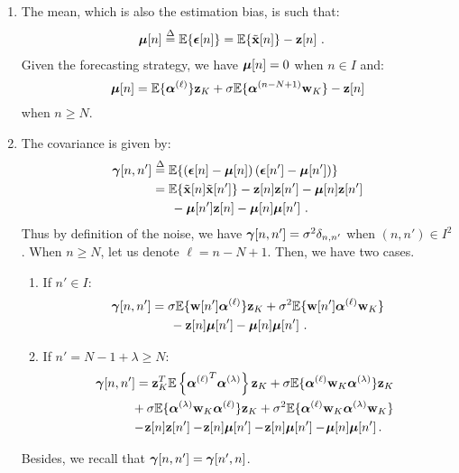 \begin{enumerate}
\item 
The mean, which is also the estimation bias, is such that: 
\begin{align*}
\boldsymbol{\mu}[n]&\overset{\Delta}{=}{\mathbb E}\{\boldsymbol{\epsilon}[n]\} 
={\mathbb E}\{\tilde{{\mathbf x}}[n]\} - {\mathbf z}[n]\ .
\end{align*}
Given the forecasting strategy, we have $\boldsymbol{\mu}[n]=0$ when $n\in I$ and: 
\begin{equation}
\bmu[n]= \EE\{\balpha^{(\ell)}\}\bz_{K} + \sigma\EE\{\balpha^{(n-N+1)}\bw_{K}\} - \bz[n]
\label{eq:bias0}
\end{equation}
when $n\geq N$.
\item 
The covariance is given by:
\begin{align*}
\boldsymbol{\gamma}[n,n'] &\overset{\Delta}{=} {\mathbb E}\{\left(\boldsymbol{\epsilon}[n]-\boldsymbol{\mu}[n]\right)\left(\boldsymbol{\epsilon}[n']-\boldsymbol{\mu}[n']\right)\}\\
&= {\mathbb E}\{\tilde{{\mathbf x}}[n]\tilde{{\mathbf x}}[n']\}-{\mathbf z}[n]{\mathbf z}[n'] -\boldsymbol{\mu}[n]{\mathbf z}[n'] \\
&\hspace{15pt} - \boldsymbol{\mu}[n']{\mathbf z}[n] -\boldsymbol{\mu}[n]\boldsymbol{\mu}[n']\ .
\end{align*}
Thus by definition of the noise, we have $\boldsymbol{\gamma}[n,n'] =\sigma^2\delta_{n,n'}$ when $(n,n')\in I^2$. When $n\geq N$, let us denote $\ell=n-N+1$. Then, we have two cases.
\begin{enumerate}[label=(\roman*)]
\item If $n'\in I$:
\begin{align}
\nonumber
\bgamma[n,n'] &= \sigma\EE\{\bw[n']\balpha^{(\ell)}\}\bz_K + \sigma^2\EE\{\bw[n']\balpha^{(\ell)}\bw_K\} \\
&\hspace{15pt} -\bz[n]\bmu[n'] - \bmu[n]\bmu[n']\ .
\label{eq:cov00}
\end{align}
\item If $n'=N-1+\lambda\geq N$:
\begin{align}
\nonumber
\hspace{-6pt}\bgamma[n,n'] &= \bz_K^T\EE\left\{{\balpha^{(\ell)}}^T\balpha^{(\lambda)}\right\}\bz_K + \sigma\EE\{\balpha^{(\ell)}\bw_K\balpha^{(\lambda)}\}\bz_K \\
\nonumber
&\hspace{-3pt} + \sigma\EE\{\balpha^{(\lambda)}\bw_K\balpha^{(\ell)}\}\bz_K + \sigma^2\EE\{\balpha^{(\ell)}\bw_K\balpha^{(\lambda)}\bw_K\}  \\
&\hspace{-3pt} -\!\bz[n]\bz[n']-\!\bz[n]\bmu[n']-\!\bz[n]\bmu[n'] -\! \bmu[n]\bmu[n']\,.
\label{eq:cov01}
\end{align}
\end{enumerate}
Besides, we recall that $\boldsymbol{\gamma}[n,n']=\boldsymbol{\gamma}[n',n]$.
\end{enumerate}

